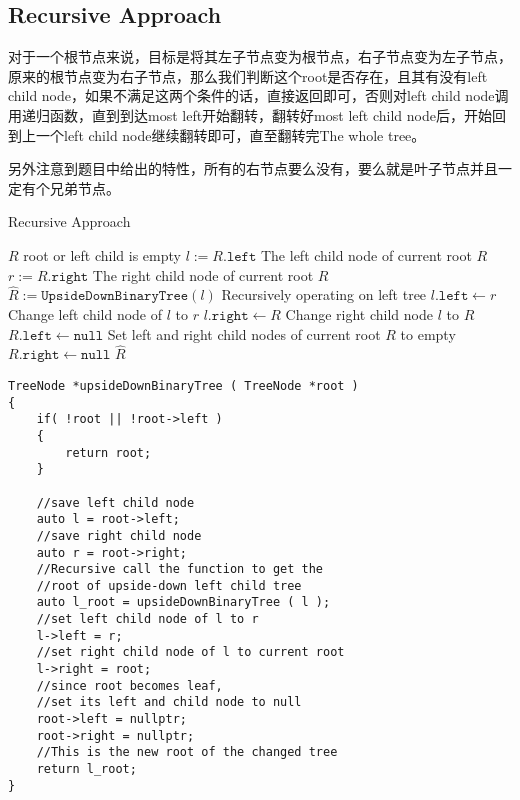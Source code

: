 \subsection{Recursive Approach}
\begin{CJK*}{UTF8}{gbsn}
对于一个根节点来说，目标是将其左子节点变为根节点，右子节点变为左子节点，原来的根节点变为右子节点，那么我们判断这个root是否存在，且其有没有left child node，如果不满足这两个条件的话，直接返回即可，否则对left child node调用递归函数，直到到达most left开始翻转，翻转好most left child node后，开始回到上一个left child node继续翻转即可，直至翻转完The whole tree。
\par
另外注意到题目中给出的特性，所有的右节点要么没有，要么就是叶子节点并且一定有个兄弟节点。
\end{CJK*}
\setcounter{algorithm}{0}
\begin{algorithm}[H]
\caption{Recursive Approach}
\begin{algorithmic}[1]
\State \Return $R$ \Comment root or left child is empty
\EndIf
\State $l:=R.\texttt{left}$ \Comment The left child node of current root $R$
\State $r:=R.\texttt{right}$ \Comment The right child node of current root $R$
\State $\hat{R}:=\texttt{UpsideDownBinaryTree}(l)$ \Comment Recursively operating on left tree
\State $l.\texttt{left}\gets r$ \Comment Change left child node of $l$ to $r$
\State $l.\texttt{right}\gets R$ \Comment Change right child node $l$ to $R$
\State $R.\texttt{left}\gets\texttt{null}$ \Comment Set left and right child nodes of current root $R$ to empty
\State $R.\texttt{right}\gets\texttt{null}$
\State \Return $\hat{R}$
\EndProcedure
\end{algorithmic}
\end{algorithm}
\setcounter{lstlisting}{0}
\begin{lstlisting}[style=customc, caption={Recursive Approach}]
TreeNode *upsideDownBinaryTree ( TreeNode *root )
{
	if( !root || !root->left )
	{
		return root;
	}

	//save left child node
	auto l = root->left;
	//save right child node
	auto r = root->right;
	//Recursive call the function to get the 
	//root of upside-down left child tree
	auto l_root = upsideDownBinaryTree ( l );
	//set left child node of l to r
	l->left = r;
	//set right child node of l to current root
	l->right = root;
	//since root becomes leaf, 
	//set its left and child node to null
	root->left = nullptr;
	root->right = nullptr;
	//This is the new root of the changed tree
	return l_root;
}
\end{lstlisting}
